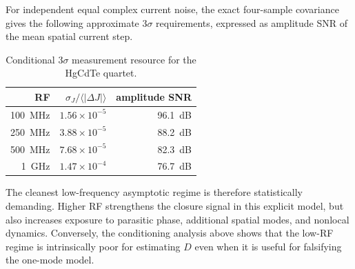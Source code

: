 \documentclass[11pt]{article}
\begin{document}
For independent equal complex current noise, the exact four-sample covariance gives the following approximate $3\sigma$ requirements, expressed as amplitude SNR of the mean spatial current step.
\begin{table}[H]
\centering
\caption{Conditional $3\sigma$ measurement resource for the HgCdTe quartet.}
\begin{tabular}{rrr}
\toprule
RF & $\sigma_J/\langle|\Delta J|\rangle$ & amplitude SNR \\
\midrule
\SI{100}{MHz} & $1.56\times10^{-5}$ & \SI{96.1}{dB} \\
\SI{250}{MHz} & $3.88\times10^{-5}$ & \SI{88.2}{dB} \\
\SI{500}{MHz} & $7.68\times10^{-5}$ & \SI{82.3}{dB} \\
\SI{1}{GHz} & $1.47\times10^{-4}$ & \SI{76.7}{dB} \\
\bottomrule
\end{tabular}
\end{table}
The cleanest low-frequency asymptotic regime is therefore statistically demanding. Higher RF strengthens the closure signal in this explicit model, but also increases exposure to parasitic phase, additional spatial modes, and nonlocal dynamics. Conversely, the conditioning analysis above shows that the low-RF regime is intrinsically poor for estimating $D$ even when it is useful for falsifying the one-mode model.
\end{document}
